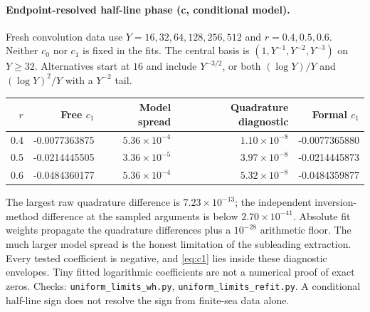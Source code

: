 \documentclass[11pt,a4paper]{article}
\newcommand{\scr}[1]{\texttt{uniform\_\allowbreak limits\_\allowbreak #1.py}}
\begin{document}
\paragraph{Endpoint-resolved half-line phase (c, conditional model).}
Fresh convolution data use $Y=16,32,64,128,256,512$ and
$r=0.4,0.5,0.6$. Neither $c_0$ nor $c_1$ is fixed in the fits.
The central basis is $(1,Y^{-1},Y^{-2},Y^{-3})$ on $Y\geq32$.
Alternatives start at $16$ and include $Y^{-3/2}$, or both
$(\log Y)/Y$ and $(\log Y)^2/Y$ with a $Y^{-2}$ tail.
\begin{center}\small\begin{tabular}{rrrrr}\toprule
$r$ & Free $c_1$ & Model spread & Quadrature diagnostic & Formal $c_1$\\\midrule
0.4 & -0.0077363875 & $5.36\times10^{-4}$ & $1.10\times10^{-8}$ & -0.0077365880\\
0.5 & -0.0214445505 & $3.36\times10^{-5}$ & $3.97\times10^{-8}$ & -0.0214445873\\
0.6 & -0.0484360177 & $5.36\times10^{-4}$ & $5.32\times10^{-8}$ & -0.0484359877\\
\bottomrule\end{tabular}\end{center}
The largest raw quadrature difference is $7.23\times10^{-13}$; the independent inversion-method difference at the sampled arguments is below $2.70\times10^{-41}$.
Absolute fit weights propagate the quadrature differences plus a $10^{-28}$
arithmetic floor. The much larger model spread is the honest limitation
of the subleading extraction. Every tested coefficient is negative, and
\eqref{eq:c1} lies inside these diagnostic envelopes. Tiny fitted logarithmic
coefficients are not a numerical proof of exact zeros. Checks: \scr{wh},
\scr{refit}. A conditional half-line sign does not resolve the sign from
finite-sea data alone.
\end{document}
